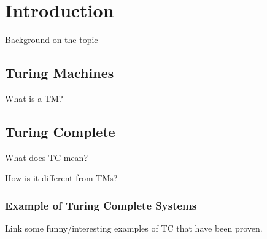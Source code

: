 \section{Introduction}
Background on the topic

\subsection{Turing Machines}

What is a TM?

\subsection{Turing Complete}

What does TC mean?

How is it different from TMs?

\subsubsection{Example of Turing Complete Systems}

Link some funny/interesting examples of TC that have been proven.